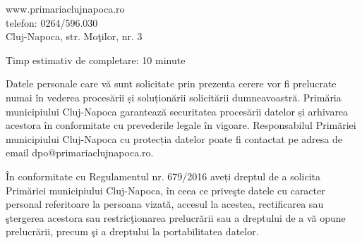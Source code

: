 \documentclass[11pt,a4paper]{article}
\begin{document}
www.primariaclujnapoca.ro\\
telefon: 0264/596.030\\
Cluj-Napoca, str. Moţilor, nr. 3

\vspace{0.3cm}

Timp estimativ de completare: 10 minute

\vspace{0.2cm}

Datele personale care vă sunt solicitate prin prezenta cerere vor fi prelucrate numai în vederea procesării și soluționării solicitării dumneavoastră. Primăria municipiului Cluj-Napoca garantează securitatea procesării datelor și arhivarea acestora în conformitate cu prevederile legale în vigoare. Responsabilul Primăriei municipiului Cluj-Napoca cu protecția datelor poate fi contactat pe adresa de email dpo@primariaclujnapoca.ro.

În conformitate cu Regulamentul nr. 679/2016 aveți dreptul de a solicita Primăriei municipiului Cluj-Napoca, în ceea ce priveşte datele cu caracter personal referitoare la persoana vizată, accesul la acestea, rectificarea sau ştergerea acestora sau restricţionarea prelucrării sau a dreptului de a vă opune prelucrării, precum şi a dreptului la portabilitatea datelor.
\end{document}
